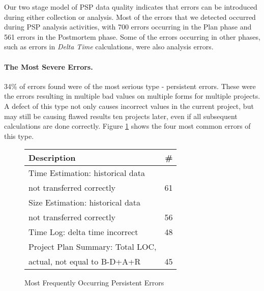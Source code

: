 Our two stage model of PSP data quality indicates that errors can be
introduced during either collection or analysis. 
Most of the errors that we detected occurred during PSP
analysis activities, with 700 errors occurring in the Plan phase and 561
errors in the Postmortem phase. Some of the errors occurring in other
phases, such as errors in {\it Delta Time} calculations, were also analysis
errors.

\paragraph{The Most Severe Errors.} 

34\% of errors found were of the most serious type - persistent errors.
These were the errors resulting in multiple bad values on multiple forms
for multiple projects.  A defect of this type not only causes incorrect
values in the current project, but may still be causing flawed results ten
projects later, even if all subsequent calculations are done correctly.
Figure \ref{errorsCommon} shows the four most common errors of this type.

\begin{figure} [htpb]
 
    \begin{center} 
    \begin{tabular}{|l|r|}\hline 
    Description & \# \\ \hline\hline 
    Time Estimation: historical data  &    \\ 
    not transferred correctly         & 61 \\ \hline
    Size Estimation: historical data  &    \\
    not transferred correctly         & 56 \\ \hline 
    
    Time Log: delta time incorrect    & 48 \\ \hline 
    Project Plan Summary: Total LOC,  &    \\
    actual, not equal to B-D+A+R      & 45 \\ \hline 
    \end{tabular}
    \end{center}  
    \caption{\label{errorsCommon} Most Frequently Occurring Persistent Errors}   
\end{figure}
    
